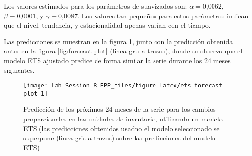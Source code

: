 \documentclass[]{article}
\newenvironment{Shaded}{\begin{snugshade}}{\end{snugshade}}
\newcommand{\DataTypeTok}[1]{\textcolor[rgb]{0.13,0.29,0.53}{#1}}
\newcommand{\DecValTok}[1]{\textcolor[rgb]{0.00,0.00,0.81}{#1}}
\newcommand{\KeywordTok}[1]{\textcolor[rgb]{0.13,0.29,0.53}{\textbf{#1}}}
\newcommand{\NormalTok}[1]{#1}
\newcommand{\OperatorTok}[1]{\textcolor[rgb]{0.81,0.36,0.00}{\textbf{#1}}}
\newcommand{\OtherTok}[1]{\textcolor[rgb]{0.56,0.35,0.01}{#1}}
\newcommand{\StringTok}[1]{\textcolor[rgb]{0.31,0.60,0.02}{#1}}
\begin{document}
Los valores estimados para los parámetros de suavizados son: \(\alpha= \text{0,0062}\), \(\beta= \text{0,0001}\), y \(\gamma= \text{0,0087}\). Los valores tan pequeños para estos parámetros indican que el nivel, tendencia, y estacionalidad apenas varían con el tiempo.

Las predicciones se muestran en la figura \ref{fig:ets-forecast-plot}, junto con la predicción obtenida antes en la figura \ref{fig:forecast-plot} (linea gris a trozos), donde se observa que el modelo ETS ajustado predice de forma similar la serie durante los 24 meses siguientes.

\begin{Shaded}
\end{Shaded}

\begin{figure}[!h]

{\centering \texttt{[image: Lab-Session-8-FPP\_files/figure-latex/ets-forecast-plot-1]} 

}

\caption{Predicción de los próximos 24 meses de la serie para los cambios proporcionales en las unidades de inventario, utilizando un modelo ETS (las predicciones obtenidas usadno el modelo seleccionado se superpone (linea gris a trozos) sobre las predicciones del modelo ETS)}\label{fig:ets-forecast-plot}
\end{figure}
\end{document}

